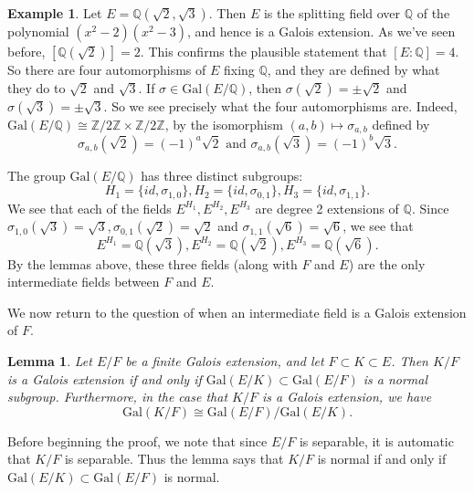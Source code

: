 \documentclass[12pt]{report}
\newtheorem{lemma}[thm]{Lemma}
\theoremstyle{definition}
\newtheorem{example}[thm]{Example}
\def\ZZ{\mathbb{Z}}
\def\QQ{\mathbb{Q}}
\def\Gal{\text{Gal}}
\begin{document}
\begin{example}
    Let $E = \QQ(\sqrt{2},\sqrt{3})$. Then $E$ is the splitting field over $\QQ$ of the polynomial $(x^2- 2)(x^2 - 3)$, and hence is a Galois extension. As we've seen before, $[\QQ(\sqrt{2})] = 2$. This confirms the plausible statement that $[E : \QQ] = 4$. So there are four automorphisms of $E$ fixing $\QQ$, and they are defined by what they do to $\sqrt{2}$ and $\sqrt{3}$. If $\sigma\in \Gal(E/\QQ)$, then $\sigma(\sqrt{2})=\pm \sqrt{2}$ and $\sigma(\sqrt{3})=\pm \sqrt{3}$. So we see precisely what the four automorphisms are. Indeed, $\Gal(E/\QQ) \cong \ZZ/2\ZZ \times \ZZ/2\ZZ$, by the isomorphism $(a, b) \mapsto \sigma_{a,b}$ defined by $$\sigma_{a,b}(\sqrt{2})=(-1)^a \sqrt{2}\mbox{ and }\sigma_{a,b}(\sqrt{3})=(-1)^b \sqrt{3}.$$

    The group $\Gal(E/\QQ)$ has three distinct subgroups:
    $$H_1=\{id, \sigma_{1,0}\}, H_2=\{id,\sigma_{0,1}\}, H_3=\{id, \sigma_{1,1}\}.$$ 
    We see that each of the fields $E^{H_1}, E^{H_2}, E^{H_3}$ are degree 2 extensions of $\QQ$. Since $\sigma_{1,0}(\sqrt{3})=\sqrt{3}, \sigma_{0,1}(\sqrt{2})=\sqrt{2}$ and $\sigma_{1,1}(\sqrt{6})=\sqrt{6}$, we see that $$E^{H_1} = \QQ(\sqrt{3}), E^{H_2}=\QQ(\sqrt{2}), E^{H_3}=\QQ(\sqrt{6}).$$
    By the lemmas above, these three fields (along with $F$ and $E$) are the only intermediate fields between $F$ and $E$.
\end{example}

We now return to the question of when an intermediate field is a Galois
extension of $F$.

\begin{lemma}
    Let $E/F$ be a finite Galois extension, and let $F \subset  K \subset  E$. Then $K/F$ is a Galois extension if and only if $\Gal(E/K) \subset  \Gal(E/F)$ is a normal subgroup. Furthermore, in the case that $K/F$ is a Galois extension, we have $$\Gal(K/F)\cong \Gal(E/F)/\Gal(E/K).$$
\end{lemma}

Before beginning the proof, we note that since $E/F$ is separable, it is automatic that $K/F$ is separable. Thus the lemma says that $K/F$ is normal if and only if $\Gal(E/K) \subset  \Gal(E/F)$ is normal.
\end{document}
